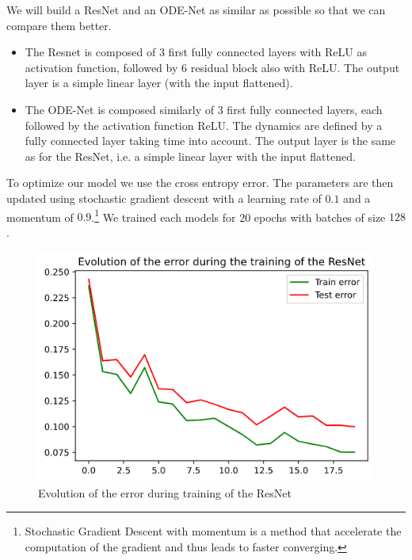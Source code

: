 \documentclass[10pt,a4paper]{article}
\theoremstyle{definition}
\theoremstyle{plain}
\begin{document}
We will build a ResNet and an ODE-Net as similar as possible so that we can compare them better.
\begin{itemize}
\item The Resnet is composed of 3 first fully connected layers with ReLU as activation function, followed by 6 residual block also with ReLU. The output layer is a simple linear layer (with the input flattened).

\item The ODE-Net is composed similarly of 3 first fully connected layers, each followed by the activation function ReLU. The dynamics are defined by a fully connected layer taking time into account. The output layer is the same as for the ResNet, i.e. a simple linear layer with the input flattened.
\end{itemize}


To optimize our model we use the cross entropy error. The parameters are then updated using stochastic gradient descent with a learning rate of $0.1$ and a momentum of $0.9$.\footnote{Stochastic Gradient Descent with momentum is a method that accelerate the computation of the gradient and thus leads to faster converging.\cite{8}}
We trained each models for 20 epochs with batches of size $128$.

\begin{figure}[!h]
\center
\includegraphics[scale=0.5]{resnet_rd_loss.png}
\caption{Evolution of the error during training of the ResNet}
\label{resnet_rd}
\end{figure}
\end{document}
